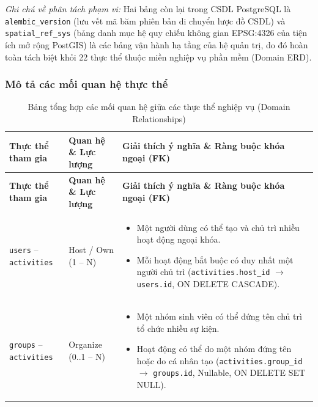 \noindent\textit{Ghi chú về phân tách phạm vi:} Hai bảng còn lại trong CSDL PostgreSQL là \texttt{alembic\_version} (lưu vết mã băm phiên bản di chuyển lược đồ CSDL) và \texttt{spatial\_ref\_sys} (bảng danh mục hệ quy chiếu không gian EPSG:4326 của tiện ích mở rộng PostGIS) là các bảng vận hành hạ tầng của hệ quản trị, do đó hoàn toàn tách biệt khỏi 22 thực thể thuộc miền nghiệp vụ phần mềm (Domain ERD).

\subsubsection{Mô tả các mối quan hệ thực thể}


\begin{longtable}{|p{}|p{}|p{}|}
    \caption{Bảng tổng hợp các mối quan hệ giữa các thực thể nghiệp vụ (Domain Relationships)} \label{tab:relationship_summary} \\
    
    \hline
    \textbf{Thực thể tham gia} & \textbf{Quan hệ \& Lực lượng} & \textbf{Giải thích ý nghĩa \& Ràng buộc khóa ngoại (FK)} \\ \hline
    \endfirsthead

    \hline
    \textbf{Thực thể tham gia} & \textbf{Quan hệ \& Lực lượng} & \textbf{Giải thích ý nghĩa \& Ràng buộc khóa ngoại (FK)} \\ \hline
    \endhead

    \hline
    \endfoot

    \hline
    \endlastfoot

    \texttt{users} -- \texttt{activities} & Host / Own \newline (1 -- N) & 
    \begin{itemize}
        \item Một người dùng có thể tạo và chủ trì nhiều hoạt động ngoại khóa.
        \item Mỗi hoạt động bắt buộc có duy nhất một người chủ trì (\texttt{activities.host\_id} $\rightarrow$ \texttt{users.id}, ON DELETE CASCADE).
    \end{itemize} \\ \hline

    \texttt{groups} -- \texttt{activities} & Organize \newline (0..1 -- N) & 
    \begin{itemize}
        \item Một nhóm sinh viên có thể đứng tên chủ trì tổ chức nhiều sự kiện.
        \item Hoạt động có thể do một nhóm đứng tên hoặc do cá nhân tạo (\texttt{activities.group\_id} $\rightarrow$ \texttt{groups.id}, Nullable, ON DELETE SET NULL).
    \end{itemize} \\ \hline


\end{longtable}
